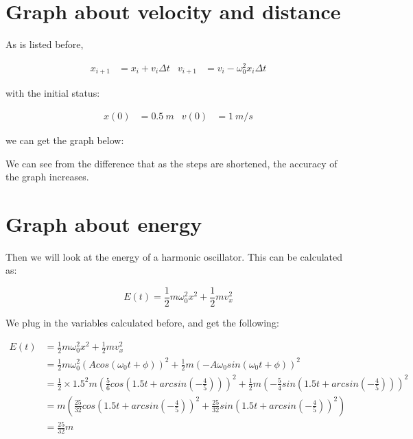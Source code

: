 \documentclass[12pt]{article}
\begin{document}
\section{Graph about velocity and distance}
As is listed before, 

\begin{align}
    x_{i+1} &= x_{i} + v_{i} \Delta t &
    v_{i+1} &= v_{i} - \omega_{0}^2 x_{i} \Delta t \nonumber 
\end{align}

with the initial status: 

\begin{align}
    x(0) &= 0.5 \ m & 
    v(0) &= 1 \ m/s \nonumber 
\end{align}

we can get the graph below: 


We can see from the difference that as the steps are shortened, the accuracy of the graph increases. 



\section{Graph about energy}
Then we will look at the energy of a harmonic oscillator. This can be calculated as: 

\begin{equation}
    E(t) = \frac{1}{2} m \omega_{0}^2 x^2 + \frac{1}{2} m v_{x}^2 
\end{equation}

We plug in the variables calculated before, and get the following: 

\begin{align}
    E(t) &= \frac{1}{2} m \omega_{0}^2 x^2 + \frac{1}{2} m v_{x}^2 \\
         &= \frac{1}{2} m \omega_{0}^2 (A cos( \omega_{0} t + \phi ))^2 + \frac{1}{2} m (-A \omega_{0} sin( \omega_{0} t + \phi ))^2 \nonumber \\
         &= \frac{1}{2} \times 1.5^2 m (\frac{5}{6} cos( 1.5 t + arcsin(-\frac{4}{5}) ))^2 + \frac{1}{2} m (-\frac{5}{4} sin( 1.5 t + arcsin(-\frac{4}{5}) ))^2 \nonumber \\
         &= m\left(\frac{25}{32}cos( 1.5 t + arcsin(-\frac{4}{5}))^2 + \frac{25}{32}sin( 1.5 t + arcsin(-\frac{4}{5}))^2\right) \nonumber \\
         &= \frac{25}{32}m \nonumber
\end{align}
\end{document}
